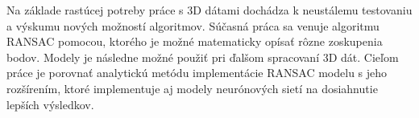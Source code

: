 Na základe rastúcej potreby práce s 3D dátami dochádza k neustálemu testovaniu a výskumu nových možností algoritmov. Súčasná práca sa venuje algoritmu RANSAC pomocou, ktorého je možné matematicky opísať rôzne zoskupenia bodov. Modely je následne možné použiť pri ďalšom spracovaní 3D dát. Cieľom práce je porovnať analytickú metódu implementácie RANSAC modelu s jeho rozšírením, ktoré implementuje aj modely neurónových sietí na dosiahnutie lepších výsledkov.